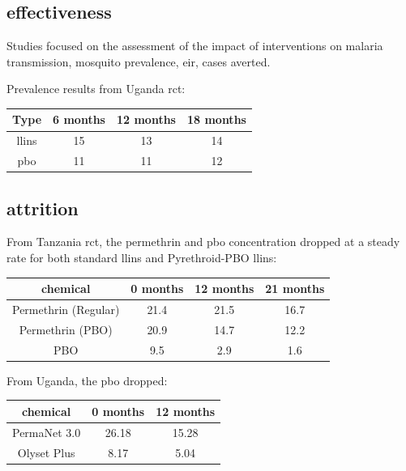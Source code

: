 \documentclass[a4paper, 12pt, twoside]{article}
\begin{document}
\subsection{effectiveness}
Studies focused on the assessment of the impact of interventions on malaria transmission, mosquito prevalence, \gls{eir}, cases averted.

Prevalence results from Uganda \gls{rct}\cite{Staedke2020}:
\begin{center}
	\begin{tabular}{c c c c}
		Type        & 6 months & 12 months & 18 months \\
		\hline
		\gls{llins} & 15       & 13        & 14        \\
		\gls{pbo}   & 11       & 11        & 12        \\
	\end{tabular}
\end{center}

\subsection{attrition}
From Tanzania\cite{Protopopoff2018} \gls{rct}, the permethrin and \gls{pbo} concentration dropped at a steady rate for both standard \gls{llins} and Pyrethroid-PBO \gls{llins}:

\begin{center}
	\begin{tabular}{cccc}
		\toprule
		chemical             & 0 months & 12 months & 21 months \\
		\midrule
		Permethrin (Regular) & 21.4     & 21.5      & 16.7      \\
		Permethrin (PBO)     & 20.9     & 14.7      & 12.2      \\
		PBO                  & 9.5      & 2.9       & 1.6       \\
		\bottomrule
	\end{tabular}
\end{center}

From Uganda\cite{Staedke2020}, the \gls{pbo} dropped:
\begin{center}
	\begin{tabular}{c c c}
		\toprule
		chemical     & 0 months & 12 months \\
		\midrule
		PermaNet 3.0 & 26.18    & 15.28     \\
		Olyset Plus  & 8.17     & 5.04      \\
		\bottomrule
	\end{tabular}
\end{center}
\end{document}
